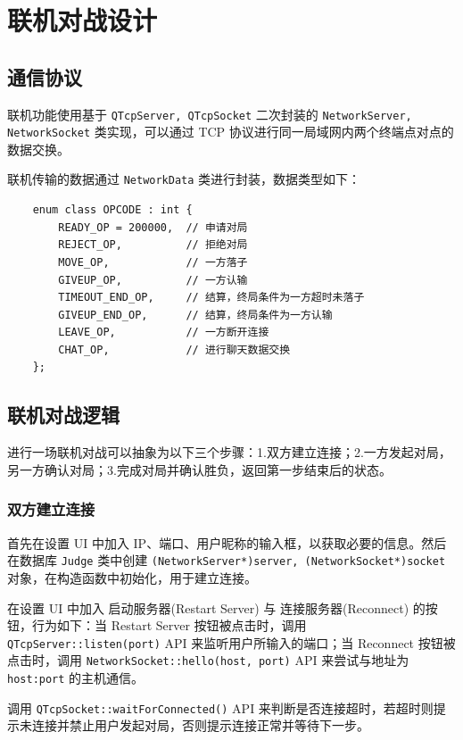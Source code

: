 \documentclass{noithesis}
\begin{document}
	\section{联机对战设计}
	
	\subsection{通信协议}
	
	联机功能使用基于 \verb|QTcpServer, QTcpSocket| 二次封装的 \verb|NetworkServer, NetworkSocket| 类实现，可以通过 TCP 协议进行同一局域网内两个终端点对点的数据交换。
	
	联机传输的数据通过 \verb|NetworkData| 类进行封装，数据类型如下：
	\begin{lstlisting}
	enum class OPCODE : int {
    	READY_OP = 200000,  // 申请对局
    	REJECT_OP,          // 拒绝对局
	    MOVE_OP,            // 一方落子
	    GIVEUP_OP,          // 一方认输
	    TIMEOUT_END_OP,     // 结算，终局条件为一方超时未落子
	    GIVEUP_END_OP,      // 结算，终局条件为一方认输
	    LEAVE_OP,           // 一方断开连接
	    CHAT_OP,            // 进行聊天数据交换
	};
	\end{lstlisting}

    \subsection{联机对战逻辑}
    
    进行一场联机对战可以抽象为以下三个步骤：1.双方建立连接；2.一方发起对局，另一方确认对局；3.完成对局并确认胜负，返回第一步结束后的状态。
	
	\subsubsection{双方建立连接}
	
	首先在设置 UI 中加入 IP、端口、用户昵称的输入框，以获取必要的信息。然后在数据库 \verb|Judge| 类中创建 \verb|(NetworkServer*)server, (NetworkSocket*)socket| 对象，在构造函数中初始化，用于建立连接。
	
	在设置 UI 中加入 启动服务器(Restart Server) 与 连接服务器(Reconnect) 的按钮，行为如下：当 Restart Server 按钮被点击时，调用 \verb|QTcpServer::listen(port)| API 来监听用户所输入的端口；当 Reconnect 按钮被点击时，调用 \verb|NetworkSocket::hello(host, port)| API 来尝试与地址为 \verb|host:port| 的主机通信。
	
	调用 \verb|QTcpSocket::waitForConnected()| API 来判断是否连接超时，若超时则提示未连接并禁止用户发起对局，否则提示连接正常并等待下一步。
	
\end{document}
